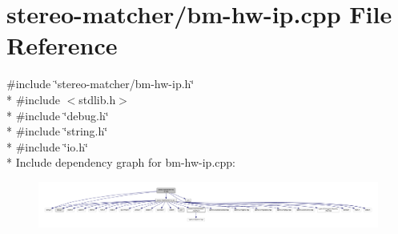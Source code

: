 \hypertarget{bm-hw-ip_8cpp}{}\section{stereo-\/matcher/bm-\/hw-\/ip.cpp File Reference}
\label{bm-hw-ip_8cpp}
{\ttfamily \#include \char`\"{}stereo-\/matcher/bm-\/hw-\/ip.\+h\char`\"{}}\\*
{\ttfamily \#include $<$stdlib.\+h$>$}\\*
{\ttfamily \#include \char`\"{}debug.\+h\char`\"{}}\\*
{\ttfamily \#include \char`\"{}string.\+h\char`\"{}}\\*
{\ttfamily \#include \char`\"{}io.\+h\char`\"{}}\\*
Include dependency graph for bm-\/hw-\/ip.cpp\+:
\nopagebreak
\begin{figure}[H]
\begin{center}
\leavevmode
\includegraphics[width=350pt]{bm-hw-ip_8cpp__incl}
\end{center}
\end{figure}
